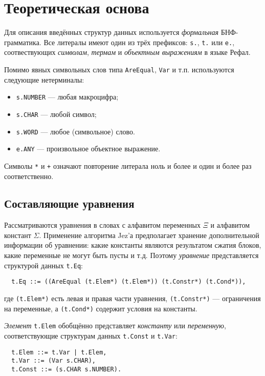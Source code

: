 \documentclass[12pt]{article}
\begin{document}
\section{Теоретическая основа}

Для описания введённых структур данных используется \textit{формальная}
БНФ-грамматика. Все литералы имеют один из трёх префиксов: \texttt{s.},
\texttt{t.} или \texttt{e.}, соотвествующих \textit{символам}, \textit{термам} и
\textit{объектным выражениям} в языке Рефал.

Помимо явных символьных слов типа \texttt{AreEqual}, \texttt{Var} и т.п.
используются следующие нетерминалы:
\begin{itemize}
  \item \texttt{s.NUMBER} --- любая макроцифра; 
  \item \texttt{s.CHAR} --- любой символ; 
  \item \texttt{s.WORD} --- любое (символьное) слово.
  \item \texttt{e.ANY} --- произвольное объектное выражение.
\end{itemize}

Символы \texttt{*} и \texttt{+} означают повторение литерала ноль и более и
один и более раз соответственно.

\subsection{Составляющие уравнения}

Рассматриваются уравнения в словах с алфавитом переменных $\Xi$ и алфавитом
констант $\Sigma$. Применение алгоритма Jez'а предполагает хранение
дополнительной информации об уравнении: какие константы являются результатом
сжатия блоков, какие переменные не могут быть пусты и т.д. Поэтому
\textit{уравнение} представляется структурой данных \texttt{t.Eq}:
\begin{Verbatim}
  t.Eq ::= ((AreEqual (t.Elem*) (t.Elem*)) (t.Constr*) (t.Cond*)),
\end{Verbatim}
где \texttt{(t.Elem*)} есть левая и правая части уравнения, \texttt{(t.Constr*)}
--- ограничения на переменные, а \texttt{(t.Cond*)} содержит условия на
константы.

\textit{Элемент} \texttt{t.Elem} обобщённо представляет \textit{константу} или
\textit{переменную}, соответствующие структурам данных \texttt{t.Const} и
\texttt{t.Var}:
\begin{Verbatim}
  t.Elem ::= t.Var | t.Elem,
  t.Var ::= (Var s.CHAR),
  t.Const ::= (s.CHAR s.NUMBER).
\end{Verbatim}
\end{document}
